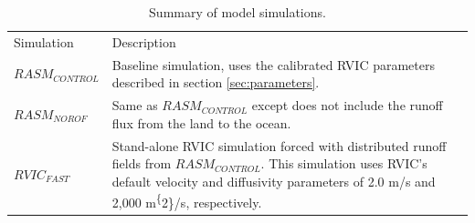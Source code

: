 \documentclass[jgrga, draft]{agutex}
\begin{document}
\clearpage

\begin{table}[]
  \caption{Summary of model simulations.}
  \label{table:simulations}
  \begin{tabular}{ll}
  Simulation       & Description \\
  $RASM_{CONTROL}$ & Baseline simulation, uses the calibrated RVIC parameters described in section \ref{sec:parameters}. \\
  $RASM_{NOROF}$   & Same as $RASM_{CONTROL}$ except does not include the runoff flux from the land to the ocean. \\
  $RVIC_{FAST}$    & Stand-alone RVIC simulation forced with distributed runoff fields from $RASM_{CONTROL}$. This simulation uses RVIC's default velocity and diffusivity parameters of 2.0 m/s and 2,000 m\textsuperscript\{2\}/s, respectively.
  \end{tabular}
\end{table}


\begin{table}
  \caption{RVIC model performance statistics for the seven rivers shown in Figure \ref{fig:rasm_domain}. The overlap statistic is calculated using normalized hydrographs whereas the bias and RMSE are calculated using the unadjusted hydrographs.}
  \label{table:rivers}
\end{table}
\end{document}
